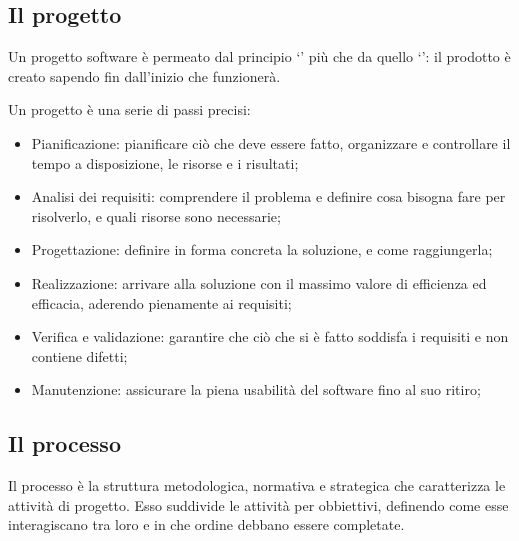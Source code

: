 \subsection{Il progetto}
Un progetto software è permeato dal principio `' più che da quello `': il prodotto è creato sapendo fin dall'inizio che funzionerà.

Un progetto è una serie di passi precisi:
\begin{itemize}
	\item Pianificazione: pianificare ciò che deve essere fatto, organizzare e controllare il tempo a disposizione, le risorse e i risultati;
	\item Analisi dei requisiti: comprendere il problema e definire cosa bisogna fare per risolverlo, e quali risorse sono necessarie;
	\item Progettazione: definire in forma concreta la soluzione, e come raggiungerla;
	\item Realizzazione: arrivare alla soluzione con il massimo valore di efficienza ed efficacia, aderendo pienamente ai requisiti;
	\item Verifica e validazione: garantire che ciò che si è fatto soddisfa i requisiti e non contiene difetti;
	\item Manutenzione: assicurare la piena usabilità del software fino al suo ritiro;
\end{itemize}

\subsection{Il processo}
Il processo è la struttura metodologica, normativa e strategica che caratterizza le attività di progetto. Esso suddivide le attività per obbiettivi, definendo come esse interagiscano tra loro e in che ordine debbano essere completate.